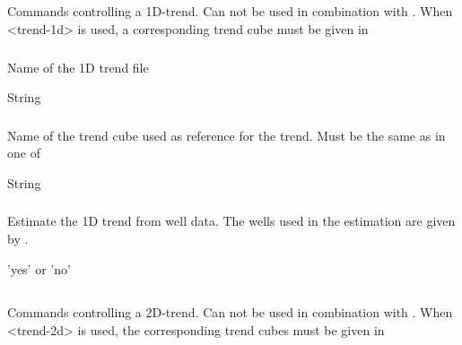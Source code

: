 {\subsection{}
 \slist
   \item \Description Commands controlling a 1D-trend. Can not be used in combination with . When <trend-1d> is used, a corresponding trend cube must be given in 
   \item \Argument
   \item \Default
 \elist

\subsubsection{}
 \slist
   \item \Description Name of the 1D trend file
   \item \Argument String
   \item \Default
 \elist

\subsubsection{}
 \slist
   \item \Description Name of the trend cube used as reference for the trend. Must be the same as  in one of 
   \item \Argument String
   \item \Default
 \elist

\subsubsection{}
 \slist
   \item \Description Estimate the 1D trend from well data. The wells used in the estimation are given by .
   \item \Argument 'yes' or 'no'
   \item \Default
 \elist

\subsection{}
 \slist
   \item \Description Commands controlling a 2D-trend. Can not be used in combination with .  When <trend-2d> is used, the corresponding trend cubes must be given in 
   \item \Argument
   \item \Default
 \elist

}
